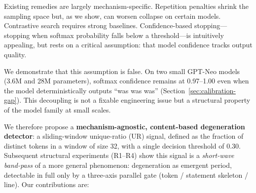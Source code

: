 \documentclass[11pt]{article}
\begin{document}
Existing remedies are largely mechanism-specific. Repetition penalties \citep{keskar2019} shrink the sampling space but, as we show, can worsen collapse on certain models. Contrastive search \citep{su2022} requires strong baselines. Confidence-based stopping---stopping when softmax probability falls below a threshold---is intuitively appealing, but rests on a critical assumption: that model confidence tracks output quality.

We demonstrate that this assumption is false. On two small GPT-Neo models (3.6M and 28M parameters), softmax confidence remains at 0.97--1.00 even when the model deterministically outputs ``was was was'' (Section~\ref{sec:calibration-gap}). This decoupling is not a fixable engineering issue but a structural property of the model family at small scales.

We therefore propose a \textbf{mechanism-agnostic, content-based degeneration detector}: a sliding-window unique-ratio (UR) signal, defined as the fraction of distinct tokens in a window of size 32, with a single decision threshold of 0.30. Subsequent structural experiments (R1--R4) show this signal is a \emph{short-wave band-pass} of a more general phenomenon: degeneration as emergent period, detectable in full only by a three-axis parallel gate (token / statement skeleton / line). Our contributions are:
\end{document}
